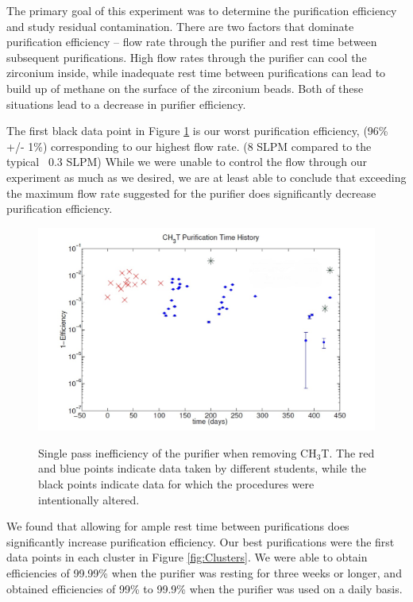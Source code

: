 The primary goal of this experiment was to determine the purification efficiency and study residual contamination.  There are two factors that dominate purification efficiency -- flow rate through the purifier and rest time between subsequent purifications.  High flow rates through the purifier can cool the zirconium inside, while inadequate rest time between purifications can lead to build up of methane on the surface of the zirconium beads.  Both of these situations lead to a decrease in purifier efficiency. 

The first black data point in Figure \ref{fig:InEff} is our worst purification efficiency, (96\% +/- 1\%) corresponding to our highest flow rate. (8 SLPM compared to the typical ~0.3 SLPM)  While we were unable to control the flow through our experiment as much as we desired, we are at least able to conclude that exceeding the maximum flow rate suggested for the purifier does significantly decrease purification efficiency.


\begin{figure}[H]
\caption{Single pass inefficiency of the purifier when removing CH$_3$T.  The red and blue points indicate data taken by different students, while the black points indicate data for which the procedures were intentionally altered. }
\centering
\includegraphics[scale=0.2]{Figone.png}
\label{fig:InEff}
\end{figure}


We found that allowing for ample rest time between purifications does significantly increase purification efficiency. Our best purifications were the first data points in each cluster in Figure \ref{fig:Clusters}.  We were able to obtain efficiencies of 99.99\% when the purifier was resting for three weeks or longer, and obtained efficiencies of 99\% to 99.9\% when the purifier was used on a daily basis.

